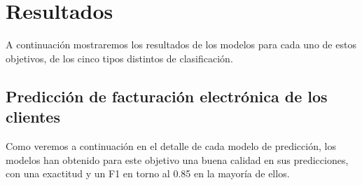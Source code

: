 \section{Resultados}

A continuación mostraremos los resultados de los modelos  para cada uno de estos objetivos, de los cinco tipos distintos de clasificación.

\subsection{Predicción de facturación electrónica de los clientes}

Como veremos a continuación en el detalle de cada modelo de predicción, los modelos han obtenido para este objetivo una buena calidad en sus predicciones, con una exactitud y un F1 en torno al 0.85 en la mayoría de ellos.

